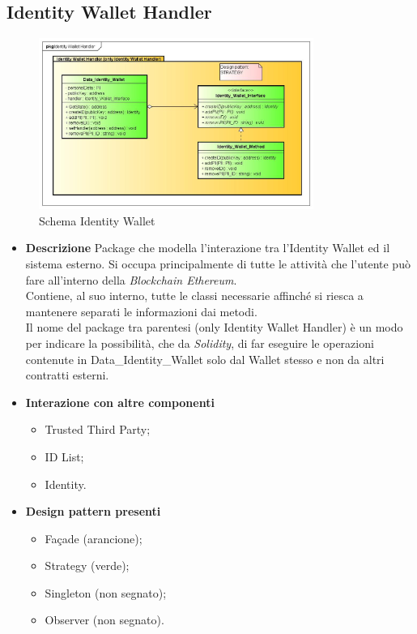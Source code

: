 \subsection{Identity Wallet Handler}
\begin{figure}[!h]
	\centering
	\includegraphics[width=0.8\textwidth]{immagini/identityWalletHandler}
	\caption{Schema Identity Wallet}
\end{figure}
\begin{itemize}
	\item \textbf{Descrizione}
	Package che modella l'interazione tra l'Identity Wallet ed il sistema esterno. Si occupa principalmente di tutte le attività che l'utente può fare all'interno della \textit{Blockchain Ethereum}.\\
	Contiene, al suo interno, tutte le classi necessarie affinché si riesca a mantenere separati le informazioni dai metodi.\\
	Il nome del package tra parentesi (only Identity Wallet Handler) è un modo per indicare la possibilità, che da \textit{Solidity}, di far eseguire le operazioni contenute in Data\_Identity\_Wallet solo dal Wallet stesso e non da altri contratti esterni.
	\item \textbf{Interazione con altre componenti}
	\begin{itemize}
		\item Trusted Third Party;
		\item ID List;
		\item Identity.
	\end{itemize}
	\item \textbf{Design pattern presenti}
	\begin{itemize}
		\item Façade (arancione);
		\item Strategy (verde);
		\item Singleton (non segnato);
		\item Observer (non segnato).
	\end{itemize}
\end{itemize}
